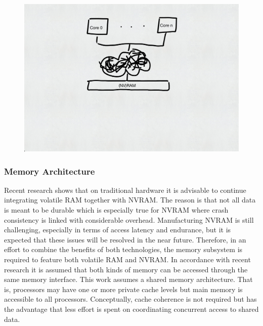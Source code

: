 \begin{figure}[h!]
    \centering
    \includegraphics[scale=0.5]{figures/drafts/concept-sys-cpu.pdf}
    \caption{}
    \label{fig:concept-sys-cpu}
\end{figure}

\subsubsection{Memory Architecture}

Recent research shows that on traditional hardware it is advisable to continue
integrating volatile \ac{RAM} together with \ac{NVRAM}. The reason is that not
all data is meant to be durable which is especially true for \ac{NVRAM} where
crash consistency is linked with considerable overhead. Manufacturing \ac{NVRAM}
is still challenging, especially in terms of access latency and endurance, but
it is expected that these issues will be resolved in the near future. Therefore,
in an effort to combine the benefits of both technologies, the memory subsystem
is required to feature both volatile \ac{RAM} and \ac{NVRAM}. In accordance with
recent research it is assumed that both kinds of memory can be accessed through
the same memory interface. This work assumes a shared memory architecture. That
is, processors may have one or more private cache levels but main memory is
accessible to all processors. Conceptually, cache coherence is not required but
has the advantage that less effort is spent on coordinating concurrent access to
shared data.

